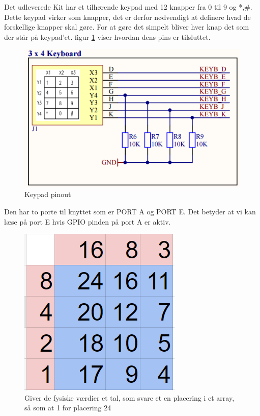 Det udleverede Kit har et tilhørende keypad med 12 knapper fra 0 til 9 og *,\#. Dette keypad virker som knapper, det er derfor nødvendigt at definere hvad de forskellige knapper skal gøre. For at gøre det simpelt bliver hver knap det som der står på keypad'et. figur \ref{fig:Keypadpins} viser hvordan dens pins er tilsluttet.
\begin{figure}[ht]
	\begin{center}
		\includegraphics[scale=0.7]{Billeder/Keypadpins.PNG}
	\end{center}
\caption{Keypad pinout}
\label{fig:Keypadpins}
\end{figure}
Den har to porte til knyttet som er PORT A og PORT E. Det betyder at vi kan læse på port E hvis GPIO pinden på port A er aktiv.
\begin{figure}[ht]
	\begin{center}
		\includegraphics[scale=0.7]{Billeder/Keypad.PNG}
	\end{center}
\caption{Giver de fysiske værdier et tal, som svare et en placering i et array, så som at 1 for placering 24}
\label{fig:Keypad}
\end{figure}



